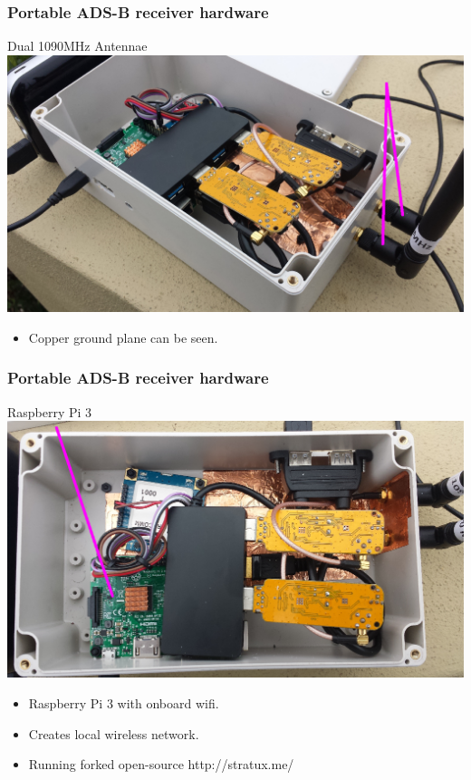 \begin{frame}
\frametitle{Portable ADS-B receiver hardware}
\begin{block}{Dual 1090MHz Antennae}
\includegraphics[height=0.5\textheight]{image/adsb-hardware-antennae.png}
\begin{itemize}
\item Copper ground plane can be seen.
\end{itemize}
\end{block}
\end{frame}

\begin{frame}
\frametitle{Portable ADS-B receiver hardware}
\begin{block}{Raspberry Pi 3}
\includegraphics[height=0.5\textheight]{image/adsb-hardware-rpi3.png}
\begin{itemize}
\item Raspberry Pi 3 with onboard wifi.
\item Creates local wireless network.
\item Running forked open-source http://stratux.me/
\end{itemize}
\end{block}
\end{frame}

